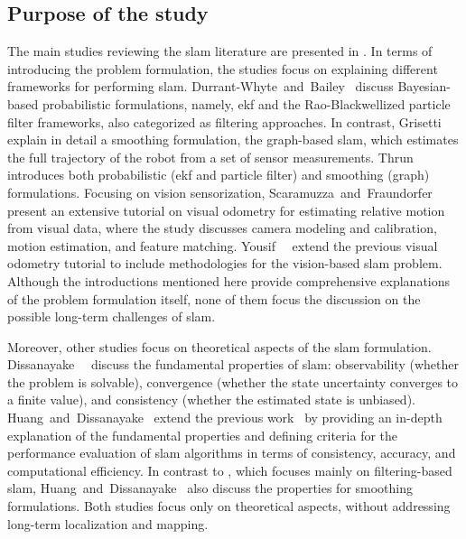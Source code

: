\subsection{Purpose of the study}\label{sec:literature:systematic:purpose}
The main studies reviewing the \gls{slam} literature are presented in
.
In terms of introducing the problem formulation,
the studies focus on explaining different frameworks for performing \gls{slam}.
Durrant-Whyte~and~Bailey~\cite{durrant-whyte-bailey:ram:2006,bailey-durrant-whyte:ram:2006}
discuss Bayesian-based probabilistic formulations,
namely, \gls{ekf} and the Rao-Blackwellized particle filter frameworks,
also categorized as filtering approaches.
In contrast, Grisetti~\etal~\cite{grisetti:itsm:2010} explain in detail
a smoothing formulation, the graph-based \gls{slam},
which estimates the full trajectory of the robot
from a set of sensor measurements.
Thrun~\cite{thrun:inbook:2008} introduces both probabilistic
(\gls{ekf} and particle filter) and
smoothing (graph) formulations.
Focusing on vision sensorization,
Scaramuzza~and~Fraundorfer~\cite{scaramuzza-fraundorfer:ram:2011,fraundorfer-scaramuzza:ram:2012}
present an extensive tutorial on visual odometry for
estimating relative motion from visual data,
where the study discusses camera modeling and calibration,
motion estimation, and feature matching.
Yousif~\etal~\cite{yousif:iis:2015} extend
the previous visual odometry tutorial
to include methodologies for the vision-based \gls{slam} problem.
Although the introductions mentioned here
provide comprehensive explanations of the problem formulation itself, none of
them focus the discussion on the possible long-term challenges of \gls{slam}.



Moreover, other studies focus on theoretical aspects
of the \gls{slam} formulation.
Dissanayake~\etal~\cite{dissanayake:iciinfs:2011} discuss the
fundamental properties of \gls{slam}:
observability (whether the problem is solvable),
convergence (whether the state uncertainty converges to a finite value),
and consistency (whether the estimated state is unbiased).
Huang~and~Dissanayake~\cite{huang-dissanayake:ijars:2016}
extend the previous work~\cite{dissanayake:iciinfs:2011} by providing an
in-depth explanation of the fundamental properties and defining criteria for the
performance evaluation of \gls{slam} algorithms in terms of
consistency, accuracy, and computational efficiency.
In contrast to \cite{dissanayake:iciinfs:2011},
which focuses mainly on filtering-based \gls{slam},
Huang~and~Dissanayake~\cite{huang-dissanayake:ijars:2016} also discuss the
properties for smoothing formulations.
Both studies focus only on theoretical aspects,
without addressing long-term localization and mapping.

